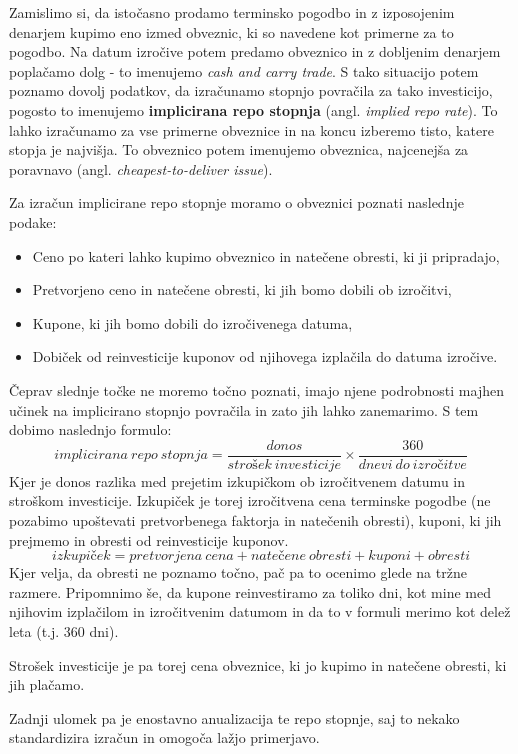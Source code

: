 \documentclass[a4paper]{article}
\begin{document}
Zamislimo si, da istočasno prodamo terminsko pogodbo in z izposojenim denarjem kupimo eno 
izmed obveznic, ki so navedene kot primerne za to pogodbo. Na datum izročive potem predamo 
obveznico in z dobljenim denarjem poplačamo dolg - to imenujemo \textit{cash and carry trade}. 
S tako situacijo potem poznamo dovolj podatkov, da izračunamo stopnjo povračila za tako 
investicijo, pogosto to imenujemo \textbf{implicirana repo stopnja} (angl. \textit{implied 
repo rate}). To lahko izračunamo za vse primerne obveznice in na koncu izberemo tisto, 
katere stopja je najvišja. To obveznico potem imenujemo obveznica, najcenejša za poravnavo 
(angl. \textit{cheapest-to-deliver issue}).

Za izračun implicirane repo stopnje moramo o obveznici poznati naslednje podake:

\begin{itemize}
    \item Ceno po kateri lahko kupimo obveznico in natečene obresti, ki ji pripradajo,
    \item Pretvorjeno ceno in natečene obresti, ki jih bomo dobili ob izročitvi, 
    \item Kupone, ki jih bomo dobili do izročivenega datuma,
    \item Dobiček od reinvesticije kuponov od njihovega izplačila do datuma izročive.
\end{itemize}

Čeprav slednje točke ne moremo točno poznati, imajo njene podrobnosti majhen učinek na 
implicirano stopnjo povračila in zato jih lahko zanemarimo. S tem dobimo naslednjo formulo:
%
$$ implicirana\:repo\:stopnja = \frac{donos}{strošek\:investicije} \times
\frac{360}{dnevi\:do\:izročitve} $$
%
Kjer je donos razlika med prejetim izkupičkom ob izročitvenem datumu in stroškom investicije. 
Izkupiček je torej izročitvena cena terminske pogodbe (ne pozabimo upoštevati pretvorbenega 
faktorja in natečenih obresti), kuponi, ki jih prejmemo in obresti od reinvesticije kuponov. 
%
$$ izkupiček = pretvorjena\:cena + natečene\:obresti + kuponi + obresti $$
%
Kjer velja, da obresti ne poznamo točno, pač pa to ocenimo glede na tržne razmere. Pripomnimo
še, da kupone reinvestiramo za toliko dni, kot mine med njihovim izplačilom in izročitvenim
datumom in da to v formuli merimo kot delež leta (t.j. $360$ dni). 

Strošek investicije je pa torej cena obveznice, ki jo kupimo in natečene obresti, ki jih plačamo.

Zadnji ulomek pa je enostavno anualizacija te repo stopnje, saj to nekako standardizira izračun
in omogoča lažjo primerjavo. 
\end{document}
